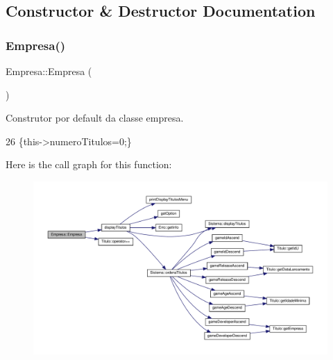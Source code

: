 \subsection{Constructor \& Destructor Documentation}
\mbox{\label{classEmpresa_aff124b958356c479ab50ddf4cf302193}} 
\subsubsection{\texorpdfstring{Empresa()}{Empresa()}\hspace{0.1cm}{\footnotesize\ttfamily [1/2]}}
{\footnotesize\ttfamily Empresa\+::\+Empresa (\begin{DoxyParamCaption}{ }\end{DoxyParamCaption})\hspace{0.3cm}{\ttfamily [inline]}}



Construtor por default da classe empresa. 


\begin{DoxyCode}
26 \{this->numeroTitulos=0;\}
\end{DoxyCode}
Here is the call graph for this function\+:
\nopagebreak
\begin{figure}[H]
\begin{center}
\leavevmode
\includegraphics[width=350pt]{classEmpresa_aff124b958356c479ab50ddf4cf302193_cgraph}
\end{center}
\end{figure}
\mbox{\label{classEmpresa_a19748f9e5c99292e3cd1489712751271}} 
